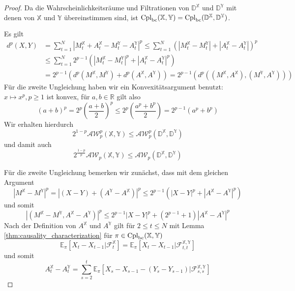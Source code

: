 \begin{proof}
    Da die Wahrscheinlichkeitsräume und Filtrationen von $\mathbb{D}^\mathbb{X}$ und $\mathbb{D}^\mathbb{Y}$ mit denen von $\mathbb{X}$ und $\mathbb{Y}$ übereinstimmen sind, ist $\operatorname{Cpl}_{\operatorname{bc}}(\mathbb{X,Y}) = \operatorname{Cpl}_{\operatorname{bc}}(\mathbb{D}^\mathbb{X}, \mathbb{D}^\mathbb{Y})$.

    Es gilt 
    \begin{align*}
        d^p(X,Y) &= \sum_{t=1}^N \left|M_t^\mathbb{X} + A_t^\mathbb{X} - M_t^\mathbb{Y} - A_t^\mathbb{Y}\right|^p \leq \sum_{t=1}^N \left(|M_t^\mathbb{X} - M_t^\mathbb{Y}| + |A_t^\mathbb{X} - A_t^\mathbb{Y}| \right)^p \\
        &\leq \sum_{t=1}^N 2^{p-1} \left( |M_t^\mathbb{X} - M_t^\mathbb{Y}|^p + |A_t^\mathbb{X} - A_t^\mathbb{Y}|^p\right) \\
        &= 2^{p-1}(d^p(M^\mathbb{X}, M^\mathbb{Y}) + d^p(A^\mathbb{X}, A^\mathbb{Y})) = 2^{p-1}\left(d^p\left((M^\mathbb{X}, A^\mathbb{X}), (M^\mathbb{Y}, A^{\mathbb{Y}}) \right) \right)
    \end{align*}
    Für die zweite Ungleichung haben wir ein Konvexitätsargument benutzt: $x\mapsto x^p, p\geq 1$ ist konvex, für $a,b\in \mathbb{R}$ gilt also
    \begin{equation}\label{eq:convexity_argument1}
        (a+b)^p= 2^p(\frac{a+b}{2})^p \leq 2^p(\frac{a^p+b^p}{2}) = 2^{p-1}(a^p+b^p)
    \end{equation}
    Wir erhalten hierdurch
    $$2^{1-p}\mathcal{AW}_p^p(\mathbb{X,Y}) \leq \mathcal{AW}_p^p(\mathbb{D}^\mathbb{X}, \mathbb{D}^\mathbb{Y})$$
    und damit auch
    $$2^{\frac{1-p}{p}}\mathcal{AW}_p(\mathbb{X,Y}) \leq \mathcal{AW}_p(\mathbb{D}^\mathbb{X}, \mathbb{D}^\mathbb{Y})$$
    
    Für die zweite Ungleichung bemerken wir zunächst, dass mit dem gleichen Argument 
    $$|M^\mathbb{X} - M^\mathbb{Y}|^p = |(X-Y) + (A^\mathbb{Y} - A^\mathbb{X})|^p \leq 2^{p-1}(|X-Y|^p + |A^\mathbb{X} - A^\mathbb{Y}|^p)$$
    und somit 
    \begin{equation}\label{eq:doob_ineq} 
        |(M^\mathbb{X}-M^\mathbb{Y}, A^\mathbb{X} - A^\mathbb{Y})|^p \leq 2^{p-1}|X-Y|^p + (2^{p-1}+1)|A^\mathbb{X}-A^\mathbb{Y}|^p
    \end{equation}
    Nach der Definition von $A^\mathbb{X}$ und $A^\mathbb{Y}$ gilt für $2\leq t\leq N$ mit Lemma \ref{thm:causality_characterization} für $\pi \in \operatorname{Cpl}_{\operatorname{bc}}(\mathbb{X,Y})$ 
    $$\mathbb{E}_\pi\left[ X_t - X_{t-1} \vert \mathcal{F}_t^\mathbb{X}\right] = \mathbb{E}_\pi\left[X_t-X_{t-1} \vert \mathcal{F}_{t,t}^\mathbb{X,Y}\right]$$
    und somit
    $$A_t^\mathbb{X} - A_t^\mathbb{Y} = \sum_{s=2}^t \mathbb{E}_\pi\left[ X_s - X_{s-1} - (Y_s - Y_{s-1}) \vert \mathcal{F}_{s,s}^\mathbb{X,Y} \right]$$ 


\end{proof}
